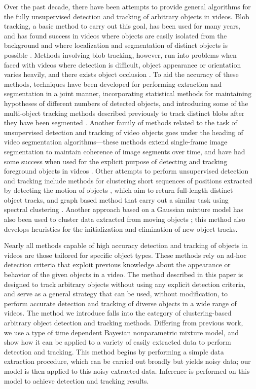 \documentclass[twocolumn, final]{svjour3}
\begin{document}
Over the past decade, there have been attempts to provide general algorithms for the fully unsupervised detection and tracking of arbitrary objects in videos. Blob tracking, a basic method to carry out this goal, has been used for many years, and has found success in videos where objects are easily isolated from the background and where localization and segmentation of distinct objects is possible \cite{francois2004real, isard_2001}. Methods involving blob tracking, however, run into problems when faced with videos where detection is difficult, object appearance or orientation varies heavily, and there exists object occlusion \cite{song2005model}. To aid the accuracy of these methods, techniques have been developed for performing extraction and segmentation in a joint manner, incorporating statistical methods for maintaining hypotheses of different numbers of detected objects, and introducing some of the multi-object tracking methods described previously to track distinct blobs after they have been segmented \cite{collins2003mean, isard_2001}. Another family of methods related to the task of unsupervised detection and tracking of video objects goes under the heading of video segmentation algorithms---these methods extend single-frame image segmentation to maintain coherence of image segments over time, and have had some success when used for the explicit purpose of detecting and tracking foreground objects in videos \cite{brox2003unsupervised, sista2000unsupervised, wang1998unsupervised}. Other attempts to perform unsupervised detection and tracking include methods for clustering short sequences of positions extracted by detecting the motion of objects \cite{brostow2006unsupervised, brox2010object}, which aim to return full-length distinct object tracks, and graph based method that carry out a similar task using spectral clustering \cite{fragkiadaki2011detection}. Another approach based on a Gaussian mixture model has also been used to cluster data extracted from moving objects \cite{pece_2002}; this method also develops heuristics for the initialization and elimination of new object tracks. 

Nearly all methods capable of high accuracy detection and tracking of objects in videos are those tailored for specific object types. These methods rely on ad-hoc detection criteria that exploit previous knowledge about the appearance or behavior of the given objects in a video. The method described in this paper is designed to track arbitrary objects without using any explicit detection criteria, and serve as a general strategy that can be used, without modification, to perform accurate detection and tracking of diverse objects in a wide range of videos. The method we introduce falls into the category of clustering-based arbitrary object detection and tracking methods. Differing from previous work, we use a type of time dependent Bayesian nonparametric mixture model, and show how it can be applied to a variety of easily extracted data to perform detection and tracking. This method begins by performing a simple data extraction procedure, which can be carried out broadly but yields noisy data; our model is then applied to this noisy extracted data. Inference is performed on this model to achieve detection and tracking results.
\end{document}
